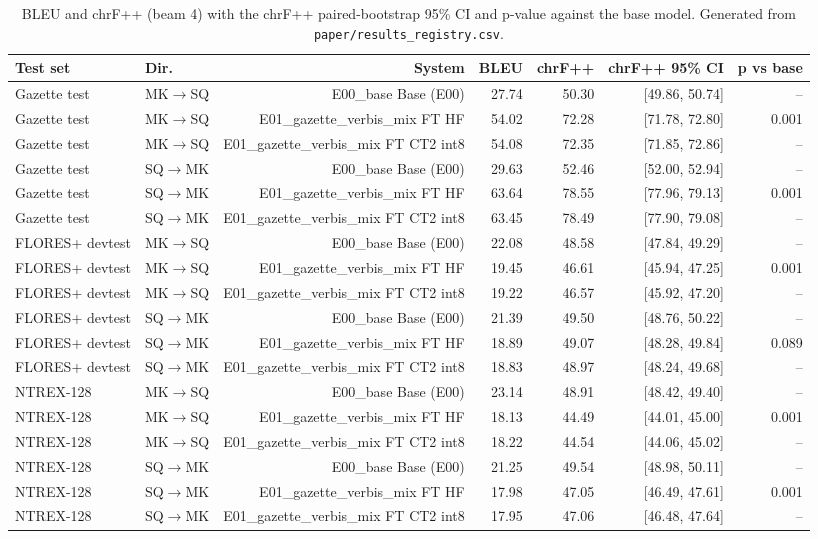 \begin{table}[t]
\centering
\small
\begin{tabular}{llrrrrr}
\toprule
Test set & Dir. & System & BLEU & chrF++ & chrF++ 95\% CI & p vs base \\
\midrule
Gazette test & MK$\rightarrow$SQ & E00\_base Base (E00) & 27.74 & 50.30 & [49.86, 50.74] & – \\
Gazette test & MK$\rightarrow$SQ & E01\_gazette\_verbis\_mix FT HF & 54.02 & 72.28 & [71.78, 72.80] & 0.001 \\
Gazette test & MK$\rightarrow$SQ & E01\_gazette\_verbis\_mix FT CT2 int8 & 54.08 & 72.35 & [71.85, 72.86] & – \\
Gazette test & SQ$\rightarrow$MK & E00\_base Base (E00) & 29.63 & 52.46 & [52.00, 52.94] & – \\
Gazette test & SQ$\rightarrow$MK & E01\_gazette\_verbis\_mix FT HF & 63.64 & 78.55 & [77.96, 79.13] & 0.001 \\
Gazette test & SQ$\rightarrow$MK & E01\_gazette\_verbis\_mix FT CT2 int8 & 63.45 & 78.49 & [77.90, 79.08] & – \\
FLORES+ devtest & MK$\rightarrow$SQ & E00\_base Base (E00) & 22.08 & 48.58 & [47.84, 49.29] & – \\
FLORES+ devtest & MK$\rightarrow$SQ & E01\_gazette\_verbis\_mix FT HF & 19.45 & 46.61 & [45.94, 47.25] & 0.001 \\
FLORES+ devtest & MK$\rightarrow$SQ & E01\_gazette\_verbis\_mix FT CT2 int8 & 19.22 & 46.57 & [45.92, 47.20] & – \\
FLORES+ devtest & SQ$\rightarrow$MK & E00\_base Base (E00) & 21.39 & 49.50 & [48.76, 50.22] & – \\
FLORES+ devtest & SQ$\rightarrow$MK & E01\_gazette\_verbis\_mix FT HF & 18.89 & 49.07 & [48.28, 49.84] & 0.089 \\
FLORES+ devtest & SQ$\rightarrow$MK & E01\_gazette\_verbis\_mix FT CT2 int8 & 18.83 & 48.97 & [48.24, 49.68] & – \\
NTREX-128 & MK$\rightarrow$SQ & E00\_base Base (E00) & 23.14 & 48.91 & [48.42, 49.40] & – \\
NTREX-128 & MK$\rightarrow$SQ & E01\_gazette\_verbis\_mix FT HF & 18.13 & 44.49 & [44.01, 45.00] & 0.001 \\
NTREX-128 & MK$\rightarrow$SQ & E01\_gazette\_verbis\_mix FT CT2 int8 & 18.22 & 44.54 & [44.06, 45.02] & – \\
NTREX-128 & SQ$\rightarrow$MK & E00\_base Base (E00) & 21.25 & 49.54 & [48.98, 50.11] & – \\
NTREX-128 & SQ$\rightarrow$MK & E01\_gazette\_verbis\_mix FT HF & 17.98 & 47.05 & [46.49, 47.61] & 0.001 \\
NTREX-128 & SQ$\rightarrow$MK & E01\_gazette\_verbis\_mix FT CT2 int8 & 17.95 & 47.06 & [46.48, 47.64] & – \\
\bottomrule
\end{tabular}
\caption{BLEU and chrF++ (beam 4) with the chrF++ paired-bootstrap 95\% CI and p-value against the base model. Generated from \texttt{paper/results\_registry.csv}.}
\label{tab:main-results}
\end{table}
